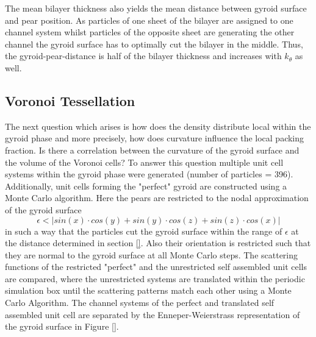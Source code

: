 \documentclass[epj,onecolumn]{webofc}
\begin{document}
The mean bilayer thickness also yields the mean distance between gyroid surface and pear position. As particles of one sheet of the bilayer are assigned to one channel system whilst particles of the opposite sheet are 
generating the other channel the gyroid surface has to optimally cut the bilayer in the middle. Thus, the gyroid-pear-distance is half of the bilayer thickness and increases with $k_{\theta}$ as well.



\subsection{Voronoi Tessellation}
\label{sec:VoroTessell}

The next question which arises is how does the density distribute local within the gyroid phase and more precisely, how does curvature influence the local packing fraction. Is there a correlation between the curvature of the gyroid surface and the volume of the Voronoi cells? To answer this question multiple unit cell systems within the gyroid phase were generated (number of particles = 396). Additionally, unit cells forming the "perfect" gyroid are constructed using a Monte Carlo algorithm. Here the pears are restricted to the nodal approximation of the gyroid surface 
\begin{equation}
\epsilon < |sin(x)\cdot cos(y)+sin(y)\cdot cos(z)+sin(z)\cdot cos(x)|
\end{equation}
 in such a way that the particles cut the gyroid surface within the range of $\epsilon$ at the distance determined in section \ref{}. Also their orientation is restricted such that they are normal to the gyroid surface at all Monte Carlo 
 steps. The scattering functions of the restricted "perfect" and the unrestricted self assembled unit cells are compared, where the unrestricted systems are translated within the periodic simulation box until the scattering 
 patterns match each other using a Monte Carlo Algorithm. The channel systems of the perfect and translated self assembled unit cell are separated by the Enneper-Weierstrass representation of the gyroid surface in Figure 
 \ref{}. \\    
\end{document}
